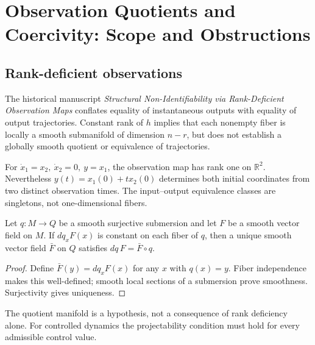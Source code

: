 \chapter{Observation Quotients and Coercivity: Scope and Obstructions}
\label{chap:observation-coercivity}
\section{Rank-deficient observations}
The historical manuscript \emph{Structural Non-Identifiability via Rank-Deficient Observation Maps} conflates equality of instantaneous outputs with equality of output trajectories. Constant rank of $h$ implies that each nonempty fiber is locally a smooth submanifold of dimension $n-r$, but does not establish a globally smooth quotient or equivalence of trajectories.
\begin{example}
For $\dot x_1=x_2,\ \dot x_2=0,\ y=x_1$, the observation map has rank one on $\mathbb R^2$. Nevertheless $y(t)=x_1(0)+t x_2(0)$ determines both initial coordinates from two distinct observation times. The input--output equivalence classes are singletons, not one-dimensional fibers.
\end{example}
\begin{theorem}
Let $q:M\to Q$ be a smooth surjective submersion and let $F$ be a smooth vector field on $M$. If $dq_{x} F(x)$ is constant on each fiber of $q$, then a unique smooth vector field $\bar F$ on $Q$ satisfies $dq\,F=\bar F\circ q$.
\end{theorem}
\begin{proof}
Define $\bar F(y)=dq_x F(x)$ for any $x$ with $q(x)=y$. Fiber independence makes this well-defined; smooth local sections of a submersion prove smoothness. Surjectivity gives uniqueness.
\end{proof}
The quotient manifold is a hypothesis, not a consequence of rank deficiency alone. For controlled dynamics the projectability condition must hold for every admissible control value.

